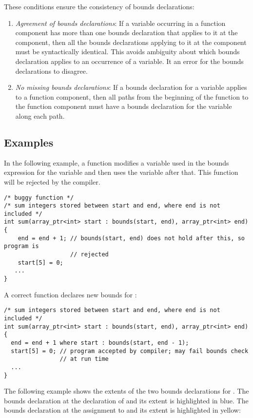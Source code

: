 These conditions ensure the consistency of bounds declarations:

\begin{enumerate}
\item
  \emph{Agreement of bounds declarations}: If a variable occurring in a
  function component has more than one bounds declaration that applies
  to it at the component, then all the bounds declarations applying to
  it at the component must be syntactically identical. This avoids
  ambiguity about which bounds declaration applies to an occurrence of a
  variable. It an error for the bounds declarations to disagree.
\item
  \emph{No missing bounds declarations}: If a bounds declaration for a
  variable applies to a function component, then all paths from the
  beginning of the function to the function component must have a bounds
  declaration for the variable along each path.
\end{enumerate}

\subsection{Examples}
\label{examples:consistency}

In the following example, a function modifies a variable 
used in the bounds expression for the variable  and then
uses the variable  after that. This function will be
rejected by the compiler.

\begin{lstlisting}
/* buggy function */
/* sum integers stored between start and end, where end is not included */
int sum(array_ptr<int> start : bounds(start, end), array_ptr<int> end)
{ 
    end = end + 1; // bounds(start, end) does not hold after this, so program is
                   // rejected
    start[5] = 0;
   ...
}
\end{lstlisting}

A correct function declares new bounds for :

\begin{lstlisting}
/* sum integers stored between start and end, where end is not included */
int sum(array_ptr<int> start : bounds(start, end), array_ptr<int> end)
{ 
  end = end + 1 where start : bounds(start, end - 1);
  start[5] = 0; // program accepted by compiler; may fail bounds check 
                // at run time
  ...
}
\end{lstlisting}

The following example shows the extents of the two bounds declarations for
.  The bounds declaration at the declaration of  and 
its extent is highlighted in blue. The bounds declaration at the assignment 
to  and its extent is highlighted in yellow:

